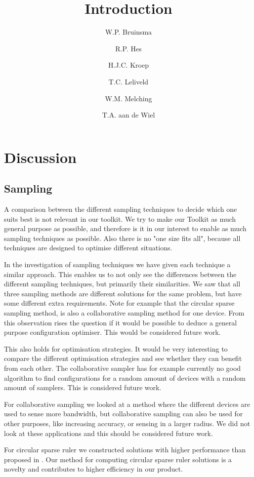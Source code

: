 \documentclass[a4paper, openany, oneside]{memoir}
\title{Introduction}
\author{W.P. Bruinsma \and R.P. Hes \and H.J.C. Kroep \and T.C. Leliveld \and W.M. Melching \and T.A. aan de Wiel}
\begin{document}
\section{Discussion}

\subsection{Sampling}
A comparison between the different sampling techniques to decide which one suits best is not relevant in our toolkit. We try to make our Toolkit as much general purpose as possible, and therefore is it in our interest to enable as much sampling techniques as possible. Also there is no "one size fits all", because all techniques are designed to optimise different situations.

In the investigation of sampling techniques we have given each technique a similar approach. This enables us to not only see the differences between the different sampling techniques, but primarily their similarities. We saw that all three sampling methods are different solutions for the same problem, but have some different extra requirements. Note for example that the circular sparse sampling method, is also a collaborative sampling method for one device. From this observation rises the question if it would be possible to deduce a  general purpose configuration optimiser. This would be considered future work.  

This also holds for optimisation strategies. It would be very interesting to compare the different optimisation strategies and see whether they can benefit from each other. The collaborative sampler has for example currently no good algorithm to find configurations for a random amount of devices with a random amount of samplers. This is considered future work.

For collaborative sampling we looked at a method where the different devices are used to sense more bandwidth, but collaborative sampling can also be used for other purposes, like increasing accuracy, or sensing in a larger radius. We did not look at these applications and this should be considered future work.

For circular sparse ruler we constructed solutions with higher performance than proposed in \cite{ariananda2012compressive}. Our method for computing circular sparse ruler solutions is a novelty and contributes to higher efficiency in our product.
\end{document}
